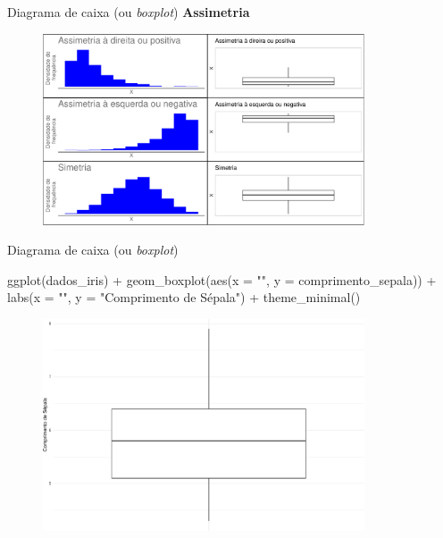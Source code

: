 \documentclass[
  10pt,
  ignorenonframetext,
]{beamer}
\newenvironment{Shaded}{\begin{snugshade}}{\end{snugshade}}
\newcommand{\AttributeTok}[1]{\textcolor[rgb]{0.40,0.45,0.13}{#1}}
\newcommand{\FunctionTok}[1]{\textcolor[rgb]{0.28,0.35,0.67}{#1}}
\newcommand{\NormalTok}[1]{\textcolor[rgb]{0.00,0.23,0.31}{#1}}
\newcommand{\SpecialCharTok}[1]{\textcolor[rgb]{0.37,0.37,0.37}{#1}}
\newcommand{\StringTok}[1]{\textcolor[rgb]{0.13,0.47,0.30}{#1}}
\begin{document}
\begin{frame}{Diagrama de caixa (ou \emph{boxplot})}
\protect\hypertarget{diagrama-de-caixa-ou-boxplot-3}{}
\textbf{Assimetria}

\begin{figure}

{\centering \includegraphics[width=0.85\textwidth,height=\textheight]{exploracao-visualizacao_files/figure-beamer/unnamed-chunk-94-1.pdf}

}

\end{figure}
\end{frame}

\begin{frame}[fragile]{Diagrama de caixa (ou \emph{boxplot})}
\protect\hypertarget{diagrama-de-caixa-ou-boxplot-4}{}
\begin{Shaded}
\begin{Highlighting}[]
\FunctionTok{ggplot}\NormalTok{(dados\_iris) }\SpecialCharTok{+}
  \FunctionTok{geom\_boxplot}\NormalTok{(}\FunctionTok{aes}\NormalTok{(}\AttributeTok{x =} \StringTok{""}\NormalTok{, }\AttributeTok{y =}\NormalTok{ comprimento\_sepala)) }\SpecialCharTok{+}
  \FunctionTok{labs}\NormalTok{(}\AttributeTok{x =} \StringTok{""}\NormalTok{, }\AttributeTok{y =} \StringTok{"Comprimento de Sépala"}\NormalTok{) }\SpecialCharTok{+}
  \FunctionTok{theme\_minimal}\NormalTok{()}
\end{Highlighting}
\end{Shaded}

\begin{figure}

{\centering \includegraphics[width=0.85\textwidth,height=\textheight]{exploracao-visualizacao_files/figure-beamer/unnamed-chunk-95-1.pdf}

}

\end{figure}
\end{frame}
\end{document}
